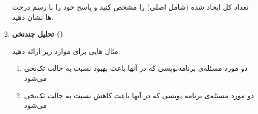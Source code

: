 \documentclass[12pt]{article}
\begin{document}
\begin{enumerate}[rightmargin=1cm,leftmargin=2cm]
\begin{latin}
\end{latin}

تعداد کل  ایجاد شده (شامل  اصلی) را مشخص کنید و پاسخ خود را با رسم درخت ها نشان دهید.

\item \textbf{تحلیل  چندنخی ()}

مثال هایی برای موارد زیر ارائه دهید:
\begin{enumerate}[label=\arabic*.]
    \item دو مورد مسئله‌ی برنامه‌نویسی که در آنها  باعث بهبود  نسبت به حالت تک‌نخی می‌شود
    \item دو مورد مسئله‌ی برنامه نویسی که در آنها  باعث کاهش  نسبت به حالت تک‌نخی می‌شود
\end{enumerate}

\end{enumerate}

\end{document}
